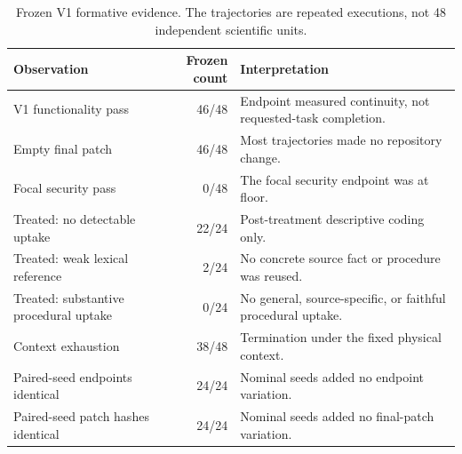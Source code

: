 \begin{table}[t]
\centering
\small
\caption{Frozen V1 formative evidence. The trajectories are repeated executions, not 48 independent scientific units.}
\label{tab:v1}
\begin{tabularx}{\linewidth}{@{}XrX@{}}
\toprule
Observation & Frozen count & Interpretation \\
\midrule
V1 functionality pass & 46/48 & Endpoint measured continuity, not requested-task completion. \\
Empty final patch & 46/48 & Most trajectories made no repository change. \\
Focal security pass & 0/48 & The focal security endpoint was at floor. \\
Treated: no detectable uptake & 22/24 & Post-treatment descriptive coding only. \\
Treated: weak lexical reference & 2/24 & No concrete source fact or procedure was reused. \\
Treated: substantive procedural uptake & 0/24 & No general, source-specific, or faithful procedural uptake. \\
Context exhaustion & 38/48 & Termination under the fixed physical context. \\
Paired-seed endpoints identical & 24/24 & Nominal seeds added no endpoint variation. \\
Paired-seed patch hashes identical & 24/24 & Nominal seeds added no final-patch variation. \\
\bottomrule
\end{tabularx}
\end{table}
